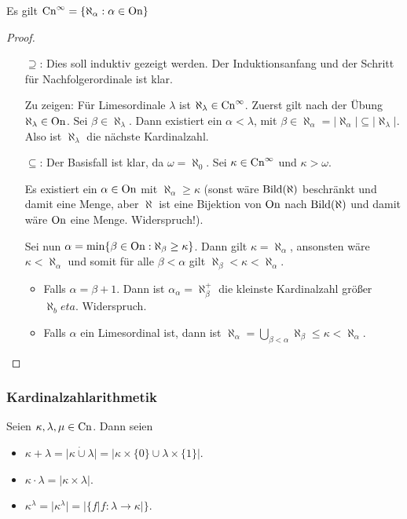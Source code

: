 \begin{satz}
	Es gilt $\operatorname{Cn}^\infty=\{\aleph_\alpha : \alpha\in \operatorname{On}\}$
\end{satz}
\begin{proof}
	\begin{itemize}
		\item[$\supseteq$:] Dies soll induktiv gezeigt werden. Der Induktionsanfang und der Schritt für Nachfolgerordinale ist klar.
		
		Zu zeigen: Für Limesordinale $\lambda$ ist $\aleph_\lambda\in \operatorname{Cn}^\infty$. Zuerst gilt nach der Übung $\aleph_\lambda\in \operatorname{On}$. Sei $\beta\in \aleph_\lambda$. Dann existiert ein $\alpha<\lambda$, mit $\beta\in \aleph_\alpha=\vert\aleph_\alpha\vert\subseteq\vert \aleph_\lambda\vert$. Also ist $\aleph_\lambda$ die nächste Kardinalzahl.
		
		\item[$\subseteq$:] Der Basisfall ist klar, da $\omega=\aleph_0$. Sei $\kappa\in \operatorname{Cn}^\infty$ und $\kappa>\omega$.
		
		Es existiert ein $\alpha\in \operatorname{On}$ mit $\aleph_\alpha\geq\kappa$ (sonst wäre $\operatorname{Bild}(\aleph)$ beschränkt und damit eine Menge, aber $\aleph$ ist eine Bijektion von $\operatorname{On}$ nach $\operatorname{Bild}(\aleph)$ und damit wäre $\operatorname{On}$ eine Menge. Widerspruch!).
		
		Sei nun $\alpha=\min\{\beta\in \operatorname{On} : \aleph_\beta \geq \kappa\}$. Dann gilt $\kappa=\aleph_\alpha$, ansonsten wäre $\kappa<\aleph_\alpha$ und somit für alle $\beta<\alpha$ gilt $\aleph_\beta < \kappa < \aleph_\alpha$.
		\begin{itemize}
			\item Falls $\alpha=\beta+1$. Dann ist $\alpha_\alpha=\aleph_\beta^+$ die kleinste Kardinalzahl größer $\aleph_beta$. Widerspruch.
			\item Falls $\alpha$ ein Limesordinal ist, dann ist $\aleph_\alpha=\bigcup_{\beta<\alpha}\aleph_\beta\leq \kappa < \aleph_\alpha$.
		\end{itemize}
	\end{itemize}
\end{proof}


\subsubsection{Kardinalzahlarithmetik}
Seien $\kappa,\lambda,\mu\in \operatorname{Cn}$.
Dann seien
\begin{itemize}
	\item $\kappa+\lambda=\vert \kappa\dot\cup \lambda\vert=\vert \kappa\times\{0\} \cup \lambda\times \{1\}\vert$.
	\item $\kappa\cdot\lambda=\vert\kappa\times \lambda\vert$.
	\item $\kappa^\lambda = \vert \kappa^\lambda\vert=\vert\{f \vert f:\lambda\to\kappa\vert\}$.
\end{itemize}


